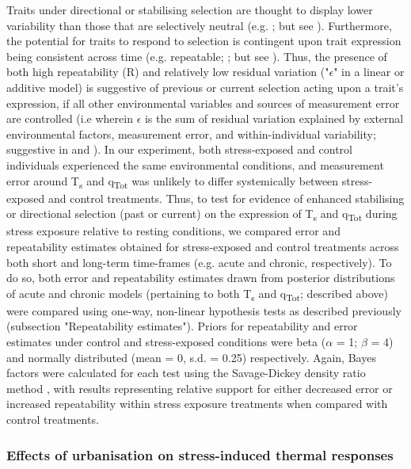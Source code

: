 \documentclass[12pt]{article}
\begin{document}
\noindent Traits under directional or stabilising selection are thought to display lower variability than those that are selectively neutral (e.g. \citealt{gibson_1974,lande_1983,vanhomrigh_2007}; but see \citealt{kotiaho_2001}). Furthermore, the potential for traits to respond to selection is contingent upon trait expression being consistent across time (e.g. repeatable; \citealt{dochtermann_2015}; but see \citealt{dohm_2002}). Thus, the presence of both high repeatability (R) and relatively low residual variation ("$\epsilon$" in a linear or additive model) is suggestive of previous or current selection acting upon a trait's expression, if all other environmental variables and sources of measurement error are controlled (i.e wherein $\epsilon$ is the sum of residual variation explained by external environmental factors, measurement error, and within-individual variability; suggestive in \citealt{gibson_1974} and \citealt{boake_1989}). In our experiment, both stress-exposed and control individuals experienced the same environmental conditions, and measurement error around T\textsubscript{s} and q\textsubscript{Tot} was unlikely to differ systemically between stress-exposed and control treatments. Thus, to test for evidence of enhanced stabilising or directional selection (past or current) on the expression of T\textsubscript{s} and q\textsubscript{Tot} during stress exposure relative to resting conditions, we compared error and repeatability estimates obtained for stress-exposed and control treatments across both short and long-term time-frames (e.g. acute and chronic, respectively). To do so, both error and repeatability estimates drawn from posterior distributions of acute and chronic models (pertaining to both T\textsubscript{s} and q\textsubscript{Tot}; described above) were compared using one-way, non-linear hypothesis tests as described previously (subsection "Repeatability estimates"). Priors for repeatability and error estimates under control and stress-exposed conditions were beta ($\alpha$ = 1; $\beta$ = 4) and normally distributed (mean = 0, s.d. = 0.25) respectively. Again, Bayes factors were calculated for each test using the Savage-Dickey density ratio method \citep{wagenmakers_2010}, with results representing relative support for either decreased error or increased repeatability within stress exposure treatments when compared with control treatments.\vspace{0.5cm}

\subsubsection{Effects of urbanisation on stress-induced thermal responses} 
\vspace{0.5cm}
\end{document}
